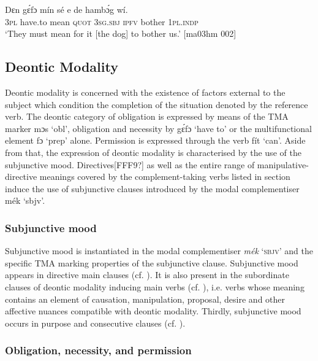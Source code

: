 \ea%
    \label{ex:key:413}
    \gll Dɛn  gɛ́fɔ    mín    sé    e    de  hambɔ́g  wí.\\
\textsc{3pl}  have.to  mean  \textsc{quot}    \textsc{3sg.sbj}  \textsc{ipfv}  bother  \textsc{1pl.indp}\\

\glt ‘They must mean for it [the dog] to bother us.’ [ma03hm 002]
\z

\subsection{Deontic Modality} 

Deontic modality is concerned with the existence of factors external to the subject which condition the completion of the situation denoted by the reference verb. The deontic category of obligation is expressed by means of the TMA marker mɔs ‘obl’, obligation and necessity by gɛ́fɔ ‘have to’ or the multifunctional element fɔ ‘prep’ alone. Permission is expressed through the verb fít ‘can’. Aside from that, the expression of deontic modality is characterised by the use of the subjunctive mood. Directives[FFF9?] as well as the entire range of manipulative-directive meanings covered by the complement-taking verbs listed in section  induce the use of subjunctive clauses introduced by the modal complementiser mék ‘sbjv’. 

\subsubsection{Subjunctive mood}\label{sec:6.7.3.1}

Subjunctive mood is instantiated in the modal complementiser \textit{mék} ‘\textsc{sbjv}’ and the specific TMA marking properties of the subjunctive clause. Subjunctive mood appears in directive main clauses (cf. ). It is also present in the subordinate clauses of deontic modality inducing main verbs (cf. ), i.e. verbs whose meaning contains an element of causation, manipulation, proposal, desire and other affective nuances compatible with deontic modality. Thirdly, subjunctive mood occurs in purpose and consecutive clauses (cf. ).

\subsubsection{Obligation, necessity, and permission}\label{sec:6.7.3.2}

